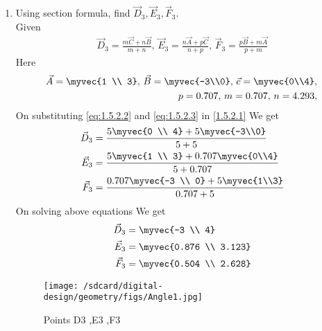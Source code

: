 \documentclass[11pt]{book}
\begin{document}
\begin{enumerate}[label=\thesection.\arabic*.,ref=\thesection.\theenumi]
\item Using section formula, find $\vec{D}_3, \vec{E}_3, \vec{F}_3$. \\
\solution Given
\begin{align}
			\vec{D}_3 = \frac{m\vec{C}+n\vec{B}}{m+n},\,
			\vec{E}_3 = \frac{n\vec{A}+p\vec{C}}{n+p},\,
			\vec{F}_3 = \frac{p\vec{B}+m\vec{A}}{p+m} \label{eq:1.5.2.1}
\end{align}
Here
\begin{align}
    \vec{A}=\myvec{1 \\ 3},\,
\vec{B}=\myvec{-3\\0},\,
	\vec{c}=\myvec{0\\4},\, \label{eq:1.5.2.2} \\
     p=0.707 ,\,
    m=0.707 ,\,
    n=4.293,\,  \label{eq:1.5.2.3}
\end{align}
On substituting \eqref{eq:1.5.2.2} and \eqref{eq:1.5.2.3} in \eqref{1.5.2.1} We get
\begin{align}
    \vec{D}_3 &= \frac{5\myvec{0 \\ 4} + 5\myvec{-3\\0}}{5+5} \\
    \vec{E}_3 &= \frac{5\myvec{1 \\ 3} + 0.707\myvec{0\\4}}{5+0.707} \\
    \vec{F}_3 &= \frac{0.707\myvec{-3 \\ 0} + 5\myvec{1\\3}}{0.707+5}
\end{align}
On solving above equations We get 
\begin{align}
    \vec{D}_3 &= \myvec{-3  \\ 4} \\
    \vec{E}_3 &= \myvec{0.876  \\ 3.123} \\
    \vec{F}_3 &= \myvec{0.504 \\ 2.628} 
\end{align}
\begin{figure}[H]
    \centering
    \texttt{[image: /sdcard/digital-design/geometry/figs/Angle1.jpg]}
    \caption{Points D3 ,E3 ,F3}
    \label{fig:Ang_bisect1}
\end{figure}


\end{enumerate}
\end{document}
